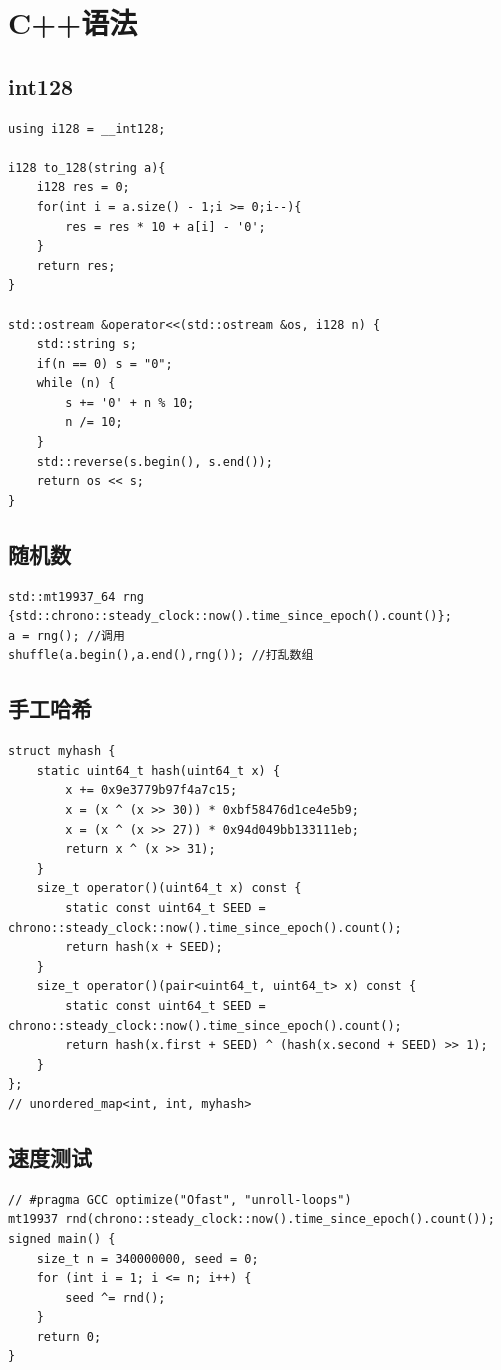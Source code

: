 \section{C++语法}
\subsection{int128}
\begin{lstlisting}[caption={}]
using i128 = __int128;

i128 to_128(string a){
    i128 res = 0;
    for(int i = a.size() - 1;i >= 0;i--){
        res = res * 10 + a[i] - '0';
    }
    return res;
}

std::ostream &operator<<(std::ostream &os, i128 n) {
    std::string s;
    if(n == 0) s = "0";
    while (n) {
        s += '0' + n % 10;
        n /= 10;
    }
    std::reverse(s.begin(), s.end());
    return os << s;
}
\end{lstlisting}

\subsection{随机数}
\begin{lstlisting}[caption={}]
std::mt19937_64 rng {std::chrono::steady_clock::now().time_since_epoch().count()};
a = rng(); //调用
shuffle(a.begin(),a.end(),rng()); //打乱数组
\end{lstlisting}

\subsection{手工哈希}
\begin{lstlisting}[caption={}]
struct myhash {
    static uint64_t hash(uint64_t x) {
        x += 0x9e3779b97f4a7c15;
        x = (x ^ (x >> 30)) * 0xbf58476d1ce4e5b9;
        x = (x ^ (x >> 27)) * 0x94d049bb133111eb;
        return x ^ (x >> 31);
    }
    size_t operator()(uint64_t x) const {
        static const uint64_t SEED = chrono::steady_clock::now().time_since_epoch().count();
        return hash(x + SEED);
    }
    size_t operator()(pair<uint64_t, uint64_t> x) const {
        static const uint64_t SEED = chrono::steady_clock::now().time_since_epoch().count();
        return hash(x.first + SEED) ^ (hash(x.second + SEED) >> 1);
    }
};
// unordered_map<int, int, myhash>
\end{lstlisting}

\subsection{速度测试}
\begin{lstlisting}[caption={}]
// #pragma GCC optimize("Ofast", "unroll-loops")
mt19937 rnd(chrono::steady_clock::now().time_since_epoch().count());
signed main() {
    size_t n = 340000000, seed = 0;
    for (int i = 1; i <= n; i++) {
        seed ^= rnd();
    }
    return 0;
}
\end{lstlisting}

